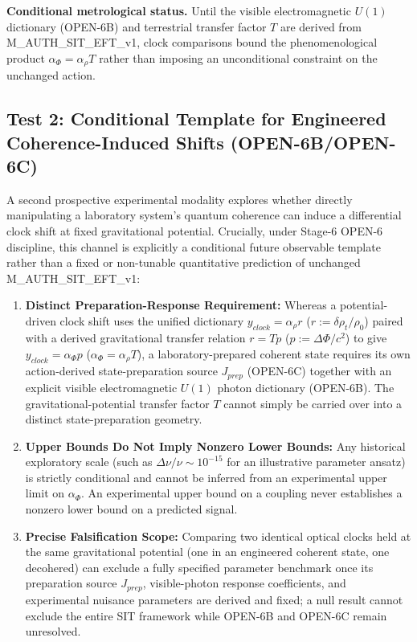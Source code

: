 \documentclass[american,11pt,letterpaper]{article}
\def\mathcal#1{#1}%
\def\mathrm#1{#1}%
\def\texttt#1{#1}%
\def\emph#1{#1}%
\begin{document}
\textbf{Conditional metrological status.} Until the visible electromagnetic \(U(1)\) dictionary (\texttt{OPEN-6B}) and terrestrial transfer factor \(\mathcal{T}\) are derived from \texttt{M\_AUTH\_SIT\_EFT\_v1}, clock comparisons bound the phenomenological product \(\alpha_\Phi = \alpha_\rho\mathcal{T}\) rather than imposing an unconditional constraint on the unchanged action.

\subsection{Test 2: Conditional Template for Engineered Coherence-Induced Shifts (\texttt{OPEN-6B}/\texttt{OPEN-6C})}
A second prospective experimental modality explores whether directly manipulating a laboratory system's quantum coherence can induce a differential clock shift at fixed gravitational potential. Crucially, under Stage-6 \texttt{OPEN-6} discipline, this channel is explicitly a \emph{conditional future observable template} rather than a fixed or non-tunable quantitative prediction of unchanged \texttt{M\_AUTH\_SIT\_EFT\_v1}:
\begin{enumerate}[leftmargin=2em]
  \item \textbf{Distinct Preparation-Response Requirement:} Whereas a potential-driven clock shift uses the unified dictionary $y_{\mathrm{clock}} = \alpha_\rho r$ ($r := \delta\rho_t/\rho_0$) paired with a derived gravitational transfer relation $r = \mathcal{T} p$ ($p := \Delta\Phi/c^2$) to give $y_{\mathrm{clock}} = \alpha_\Phi p$ ($\alpha_\Phi = \alpha_\rho\mathcal{T}$), a laboratory-prepared coherent state requires its own action-derived state-preparation source $J_{\mathrm{prep}}$ (\texttt{OPEN-6C}) together with an explicit visible electromagnetic $U(1)$ photon dictionary (\texttt{OPEN-6B}). The gravitational-potential transfer factor $\mathcal{T}$ cannot simply be carried over into a distinct state-preparation geometry.
  \item \textbf{Upper Bounds Do Not Imply Nonzero Lower Bounds:} Any historical exploratory scale (such as $\Delta\nu/\nu \sim 10^{-15}$ for an illustrative parameter ansatz) is strictly conditional and cannot be inferred from an experimental upper limit on $\alpha_\Phi$. An experimental upper bound on a coupling never establishes a nonzero lower bound on a predicted signal.
  \item \textbf{Precise Falsification Scope:} Comparing two identical optical clocks held at the same gravitational potential (one in an engineered coherent state, one decohered) can exclude a \emph{fully specified parameter benchmark} once its preparation source $J_{\mathrm{prep}}$, visible-photon response coefficients, and experimental nuisance parameters are derived and fixed; a null result cannot exclude the entire SIT framework while \texttt{OPEN-6B} and \texttt{OPEN-6C} remain unresolved.
\end{enumerate}
\end{document}
